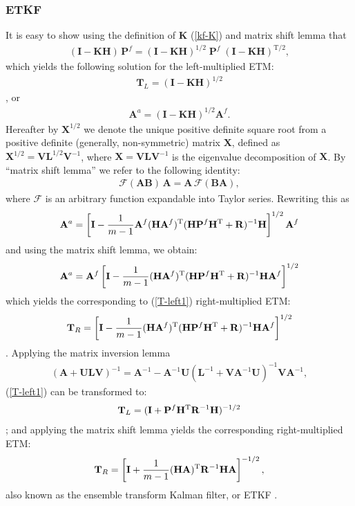 \documentclass[11pt]{report}
\newcommand{\mb} {\mathbf}
\newcommand{\T}{^{\tiny \mathrm T}}
\newcommand{\TS}{^{{\mathrm T}/2}}
\begin{document}
\subsubsection{ETKF}

It is easy to show using the definition of $\mb K$ (\ref{kf-K}) and matrix shift lemma that 
\begin{align*}
    (\mb I - \mb K \mb H) \, \mb P^f = (\mb I - \mb K \mb H)^{1/2} \; \mb P^f \; (\mb I - \mb K \mb H)\TS,
\end{align*}
which yields the following solution for the left-multiplied ETM:
\begin{align}
  \label{T-left1}
  \mb T_L = (\mb I - \mb K \mb H)^{1/2}
\end{align}
\citep{sak08b}, or
\begin{align*}
  \mb A^a =  (\mb I - \mb K \mb H)^{1/2} \mb A^f.
\end{align*}
Hereafter by $\mb X^{1/2}$ we denote the unique positive definite square root from a positive definite (generally, non-symmetric) matrix $\mb X$, defined as $\mb X^{1/2} = \mb V \mb L^{1/2} \mb V^{-1}$, where $\mb X = \mb V \mb L \mb V^{-1}$ is the eigenvalue decomposition of $\mb X$.
By ``matrix shift lemma'' we refer to the following identity:
\begin{align}
  \label{shift}
  \mathcal F(\mb A \mb B) \, \mb A = \mb A \, \mathcal F(\mb B \mb A),
\end{align}
where $\mathcal F$ is an arbitrary function expandable into Taylor series.
Rewriting this as
\begin{align*}
  \mb A^a = \left[ \mb I - \frac{1}{m-1} \mb A^f (\mb H \mb A^f)\T  (\mb H \mb P^f \mb H\T + \mb R)^{-1} \mb H \right]^{1/2} \mb A^f
\end{align*}
and using the matrix shift lemma, we obtain:
\begin{align*}
  \mb A^a = \mb A^f \left[ \mb I - \frac{1}{m-1} (\mb H \mb A^f)\T  (\mb H \mb P^f \mb H\T + \mb R)^{-1} \mb H \mb A^f \right]^{1/2}
\end{align*}
which yields the corresponding to (\ref{T-left1}) right-multiplied ETM:
\begin{align}
  \label{T-right1}
  \mb T_R = \left[ \mb I -  \frac{1}{m-1} (\mb H \mb A^f)\T  (\mb H \mb P^f \mb H\T + \mb R)^{-1} \mb H \mb A^f \right]^{1/2}
\end{align}
\citep{eve04a}.
Applying the matrix inversion lemma
\begin{align}
  \label{inv}
  (\mb A + \mb U \mb L \mb V)^{-1} = \mb A^{-1} - \mb A^{-1} \mb U (\mb L^{-1} + \mb V \mb A^{-1} \mb U)^{-1} \mb V \mb A^{-1},
\end{align}
(\ref{T-left1}) can be transformed to:
\begin{align}
  \label{T-left2}
  \mb T_L = (\mb I + \mb P^f \mb H\T \mb R^{-1} \mb H)^{-1/2}
\end{align}
\citep{sak11a}; and applying the matrix shift lemma yields the corresponding right-multiplied ETM:
\begin{align}
  \label{etkf}
  \mb T_R = \left[\mb I +  \frac{1}{m-1} (\mb H \mb A)\T \mb R^{-1} \mb H \mb A\right]^{-1/2},
\end{align}
also known as the ensemble transform Kalman filter, or ETKF \citep{bis01a}.
\end{document}
